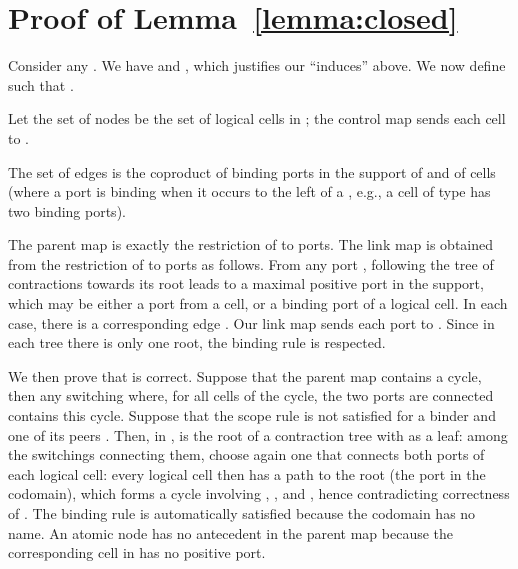 \documentclass{llncs}
\begin{document}
\section{Proof of Lemma~\ref{lemma:closed}}
  Consider any .  We have 
  and , which justifies our
  ``induces'' above.  We now define  such that .

  Let the set of nodes  be the set of logical cells in ; the
  control map  sends each  cell to .  
  
  The set of edges is the coproduct of binding  ports in the
  support of  and of  cells (where a  port is binding when
  it occurs to the left of a , e.g., a cell of type  has two binding ports).

  The parent map  is exactly the restriction
  of  to  ports.  The link map  is obtained from the restriction of  to  ports
  as follows. From any  port , following the tree of
  contractions towards its root leads to a maximal positive
   port in the support, which may be either a port from a 
  cell, or a binding port of a logical cell.  In each case, there is a
  corresponding edge .  Our link map sends each port  to
  . Since in each tree there is only one root, the binding rule
  is respected.

  We then prove that  is correct.  Suppose that the parent map
  contains a cycle, then any switching where, for all cells of the
  cycle, the two  ports are connected contains this cycle.  Suppose
  that the scope rule is not satisfied for a binder  and one of its
  peers . Then, in ,  is the root of a contraction tree with
   as a leaf: among the switchings connecting them, choose again
  one that connects both  ports of each logical cell: every logical
  cell then has a path to the root  (the  port in the codomain),
  which forms a cycle involving , , and , hence
  contradicting correctness of .  The binding rule is automatically
  satisfied because the codomain has no name.  An atomic node has no
  antecedent in the parent map because the corresponding cell in 
  has no positive  port.
\end{document}
